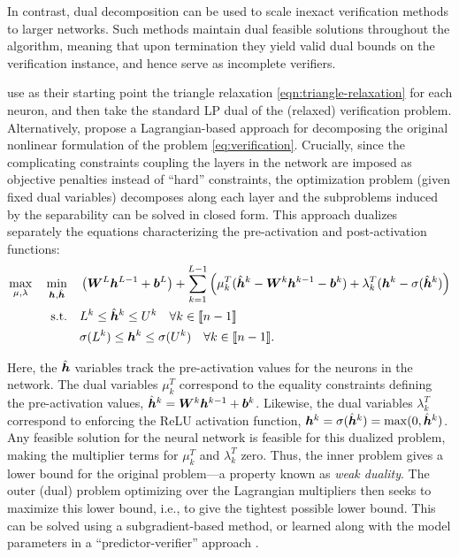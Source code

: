 In contrast, dual decomposition can be used to scale inexact verification methods to larger networks. Such methods maintain dual feasible solutions throughout the algorithm, meaning that upon termination they yield valid dual bounds on the verification instance, and hence serve as incomplete verifiers.

\cite{wong2018provable,wong2018scaling} use as their starting point the triangle relaxation \eqref{eqn:triangle-relaxation} for each neuron, and then take the standard LP dual of the (relaxed) verification problem. Alternatively, \cite{dvijotham2018dual} propose a Lagrangian-based approach for decomposing the original nonlinear formulation of the problem \eqref{eq:verification}. Crucially, since the complicating constraints coupling the layers in the network are imposed as objective penalties instead of ``hard'' constraints, the optimization problem (given fixed dual variables) decomposes along each layer and the subproblems induced by the separability can be solved in closed form. This approach dualizes separately the equations characterizing the pre-activation and post-activation functions:
\begin{align*}
    \max_{\mu,\lambda}\quad \min_{{\bm{h}},\hat{{\bm{h}}}} \quad& \left( {\bm{W}}^L {{\bm{h}}}^{L-1} + {\bm{b}}^L \right) + \sum_{k=1}^{L-1} \left( \mu_k^T(\hat{{\bm{h}}}^k - {\bm{W}}^k {\bm{h}}^{k-1} - {\bm{b}}^k) + \lambda_k^T({\bm{h}}^k - \sigma(\hat{{\bm{h}}}^k) \right) \\
    \text{s.t.} \quad& L^k \leq \hat{{\bm{h}}}^k \leq U^k \quad \forall k \in \llbracket n - 1 \rrbracket \\
    & \sigma(L^k) \leq {\bm{h}}^k \leq \sigma(U^k) \quad \forall k \in \llbracket n - 1 \rrbracket.
\end{align*}

Here, the $\hat{{\bm{h}}}$ variables track the pre-activation values for the neurons in the network. 
The dual variables $\mu_k^T$ correspond to the equality constraints defining the pre-activation values, $\hat{{\bm{h}}}^k = {\bm{W}}^k {\bm{h}}^{k-1} + {\bm{b}}^k$. 
Likewise, the dual variables $\lambda_k^T$ correspond to enforcing the ReLU activation function, ${\bm{h}}^k = \sigma(\hat{{\bm{h}}}^k) = \mathrm{max} (0, \hat{{\bm{h}}}^k)$. 
Any feasible solution for the neural network is feasible for this dualized problem, making the multiplier terms for $\mu_k^T$ and $\lambda_k^T$ zero. 
Thus, the inner problem gives a lower bound for the original problem---a property known as \emph{weak duality}. 
The outer (dual) problem optimizing over the Lagrangian multipliers then seeks to maximize this lower bound, i.e., to give the tightest possible lower bound. This can be solved using a subgradient-based method, or learned along with the model parameters in a ``predictor-verifier'' approach \citep{dvijotham2018training}. 

